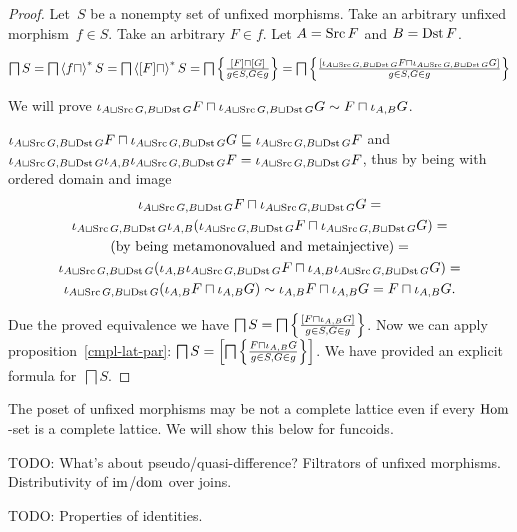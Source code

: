 \begin{proof}
Let~$S$ be a nonempty set of unfixed morphisms. Take
an arbitrary unfixed morphism~$f\in S$. Take an
arbitrary $F\in f$. Let $A=\operatorname{Src} F$ and $B=\operatorname{Dst} F$.

$\bigsqcap S=\bigsqcap\left\langle f\sqcap\right\rangle ^{\ast}S=
\bigsqcap\left\langle [F]\sqcap\right\rangle ^{\ast}S=
\bigsqcap\left\{ \frac{[F]\sqcap[G]}{g\in S,G\in g}\right\}=
\bigsqcap\left\{ \frac{[\iota_{A\sqcup\operatorname{Src} G,B\sqcup\operatorname{Dst} G}F\sqcap\iota_{A\sqcup\operatorname{Src} G,B\sqcup\operatorname{Dst} G}G]}{g\in S,G\in g}\right\}$

We will prove
$\iota_{A\sqcup\operatorname{Src} G,B\sqcup\operatorname{Dst} G}F\sqcap\iota_{A\sqcup\operatorname{Src} G,B\sqcup\operatorname{Dst} G}G \sim F\sqcap\iota_{A,B}G$.

$\iota_{A\sqcup\operatorname{Src} G,B\sqcup\operatorname{Dst} G}F\sqcap\iota_{A\sqcup\operatorname{Src} G,B\sqcup\operatorname{Dst} G}G\sqsubseteq
\iota_{A\sqcup\operatorname{Src} G,B\sqcup\operatorname{Dst} G}F$ and
$\iota_{A\sqcup\operatorname{Src} G,B\sqcup\operatorname{Dst} G}\iota_{A,B}\iota_{A\sqcup\operatorname{Src} G,B\sqcup\operatorname{Dst} G}F=
\iota_{A\sqcup\operatorname{Src} G,B\sqcup\operatorname{Dst} G}F$, thus by
being with ordered domain and image
\begin{multline*}
\iota_{A\sqcup\operatorname{Src} G,B\sqcup\operatorname{Dst} G}F\sqcap\iota_{A\sqcup\operatorname{Src} G,B\sqcup\operatorname{Dst} G}G = \\
\iota_{A\sqcup\operatorname{Src} G,B\sqcup\operatorname{Dst} G}\iota_{A,B}(\iota_{A\sqcup\operatorname{Src} G,B\sqcup\operatorname{Dst} G}F\sqcap\iota_{A\sqcup\operatorname{Src} G,B\sqcup\operatorname{Dst} G}G) = \\
\text{(by being metamonovalued and metainjective)} = \\
\iota_{A\sqcup\operatorname{Src} G,B\sqcup\operatorname{Dst} G}(
\iota_{A,B}\iota_{A\sqcup\operatorname{Src} G,B\sqcup\operatorname{Dst} G}F\sqcap
\iota_{A,B}\iota_{A\sqcup\operatorname{Src} G,B\sqcup\operatorname{Dst} G}G) = \\
\iota_{A\sqcup\operatorname{Src} G,B\sqcup\operatorname{Dst} G}(
\iota_{A,B}F\sqcap\iota_{A,B}G) \sim
\iota_{A,B}F\sqcap\iota_{A,B}G=
F\sqcap\iota_{A,B}G.
\end{multline*}

Due the proved equivalence we have
$\bigsqcap S=
\bigsqcap\left\{ \frac{[F\sqcap\iota_{A,B}G]}{g\in S,G\in g}\right\}$.
Now we can apply proposition~\ref{cmpl-lat-par}:
$\bigsqcap S=
\left[\bigsqcap\left\{ \frac{F\sqcap\iota_{A,B}G}{g\in S,G\in g}\right\}\right]$. We have provided an explicit formula
for~$\bigsqcap S$.
\end{proof}

The poset of unfixed morphisms may be not a complete
lattice even if every $\operatorname{Hom}$-set is a complete lattice.
We will show this below for funcoids.

TODO:
What's about pseudo/quasi-difference? Filtrators of unfixed morphisms.
Distributivity of $\operatorname{im}$/$\operatorname{dom}$ over joins.

TODO: Properties of identities.


